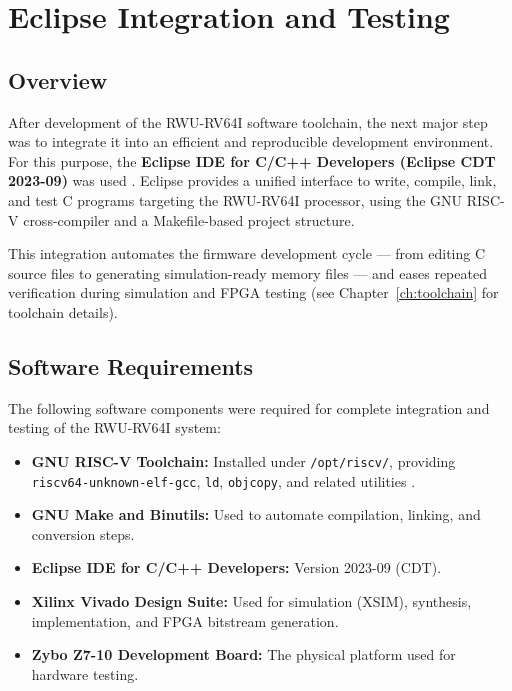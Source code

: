 \chapter{Eclipse Integration and Testing}
\label{ch:eclipse}

\section{Overview}
After development of the RWU-RV64I software toolchain, the next major step was to integrate it into an efficient and reproducible development environment.  
For this purpose, the \textbf{Eclipse IDE for C/C++ Developers (Eclipse CDT 2023-09)} was used \cite{eclipse-cdt}.  
Eclipse provides a unified interface to write, compile, link, and test C programs targeting the RWU-RV64I processor, using the GNU RISC-V cross-compiler and a Makefile-based project structure.

This integration automates the firmware development cycle — from editing C source files to generating simulation-ready memory files — and eases repeated verification during simulation and FPGA testing (see Chapter~\ref{ch:toolchain} for toolchain details).

\section{Software Requirements}
The following software components were required for complete integration and testing of the RWU-RV64I system:

\begin{itemize}
   \item \textbf{GNU RISC-V Toolchain:} Installed under 
   \texttt{/opt/\allowbreak riscv/}, providing 
   \texttt{riscv64-\allowbreak unknown-\allowbreak elf-\allowbreak gcc}, 
   \texttt{ld}, \texttt{objcopy}, and related utilities 
   \cite{riscv-gnu-toolchain,gcc,binutils}.

  \item \textbf{GNU Make and Binutils:} Used to automate compilation, linking, and conversion steps.
  \item \textbf{Eclipse IDE for C/C++ Developers:} Version 2023-09 (CDT). \cite{eclipse-cdt}
  \item \textbf{Xilinx Vivado Design Suite:} Used for simulation (XSIM), synthesis, implementation, and FPGA bitstream generation. \cite{xilinx-vivado}
  \item \textbf{Zybo Z7-10 Development Board:} The physical platform used for hardware testing. \cite{zybo-datasheet}
\end{itemize}

